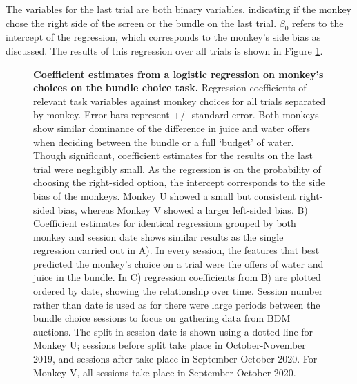 The variables for the last trial are both binary variables, indicating if the monkey chose the right side of the screen or the bundle on the last trial. $\beta_0$ refers to the intercept of the regression, which corresponds to the monkey’s side bias as discussed. The results of this regression over all trials is shown in Figure \ref{fig:bundle_regression}.

\begin{figure}[htbp!] 
\centering    

\caption[Coefficient estimates from a logistic regression on monkey’s choices on the bundle choice task.]{\textbf{Coefficient estimates from a logistic regression on monkey’s choices on the bundle choice task.} Regression coefficients of relevant task variables against monkey choices for all trials separated by monkey. Error bars represent +/- standard error. Both monkeys show similar dominance of the difference in juice and water offers when deciding between the bundle or a full ‘budget’ of water. Though significant, coefficient estimates for the results on the last trial were negligibly small. As the regression is on the probability of choosing the right-sided option, the intercept corresponds to the side bias of the monkeys. Monkey U showed a small but consistent right-sided bias, whereas Monkey V showed a larger left-sided bias. B) Coefficient estimates for identical regressions grouped by both monkey and session date shows similar results as the single regression carried out in A). In every session, the features that best predicted the monkey’s choice on a trial were the offers of water and juice in the bundle. In C) regression coefficients from B) are plotted ordered by date, showing the relationship over time. Session number rather than date is used as for there were large periods between the bundle choice sessions to focus on gathering data from BDM auctions. The split in session date is shown using a dotted line for Monkey U; sessions before split take place in October-November 2019, and sessions after take place in September-October 2020. For Monkey V, all sessions take place in September-October 2020.}
\label{fig:bundle_regression}
\end{figure}

